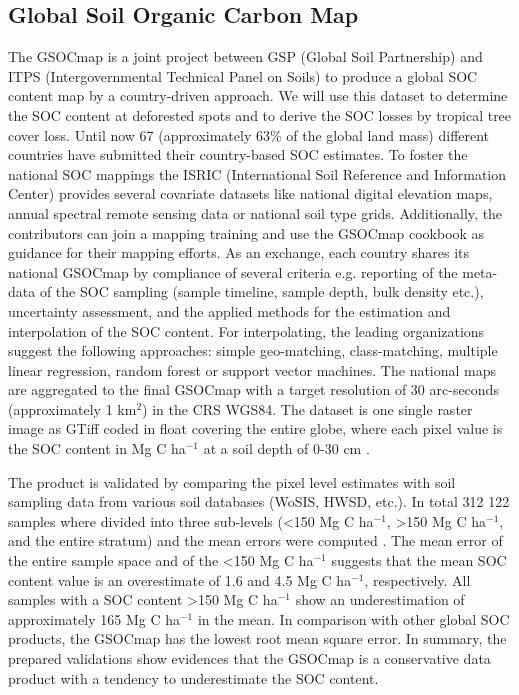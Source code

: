 	\subsection{Global Soil Organic Carbon Map}
		The \ac{GSOCmap} is a joint project between GSP (Global Soil Partnership) and ITPS (Intergovernmental Technical Panel on Soils) to produce a global \ac{SOC} content map by a country-driven approach. We will use this dataset to determine the \ac{SOC} content at deforested spots and to derive the \ac{SOC} losses by tropical tree cover loss. Until now 67 (approximately 63\% of the global land mass) different countries have submitted their country-based \ac{SOC} estimates. To foster the national \ac{SOC} mappings the ISRIC (International Soil Reference and Information Center) provides several covariate datasets like national digital elevation maps, annual spectral remote sensing data or national soil type grids. Additionally, the contributors can join a mapping training and use the \ac{GSOCmap} cookbook as guidance for their mapping efforts. As an exchange, each country shares its national \ac{GSOCmap} by compliance of several criteria e.g. reporting of the meta-data of the \ac{SOC} sampling (sample timeline, sample depth, bulk density etc.), uncertainty assessment, and the applied methods for the estimation and interpolation of the \ac{SOC} content. For interpolating, the leading organizations suggest the following approaches: simple geo-matching, class-matching, multiple linear regression, random forest or support vector machines. The national maps are aggregated to the final \ac{GSOCmap} with a target resolution of 30 arc-seconds (approximately 1 km$^2$) in the \ac{CRS} \ac{WGS84}. The dataset is one single raster image as \ac{GTiff} coded in float covering the entire globe, where each pixel value is the \ac{SOC} content in Mg C ha$^{-1}$ at a soil depth of 0-30 cm \citep{FAO2018}.

		The product is validated by comparing the pixel level estimates with soil sampling data from various soil databases (WoSIS, HWSD, etc.). In total 312 122 samples where divided into three sub-levels (<150 Mg C ha$^{-1}$, >150 Mg C ha$^{-1}$, and the entire stratum) and the mean errors were computed . The mean error of the entire sample space and of the <150 Mg C ha$^{-1}$ suggests that the mean \ac{SOC} content value is an overestimate of 1.6 and 4.5 Mg C ha$^{-1}$, respectively. All samples with a \ac{SOC} content >150 Mg C ha$^{-1}$ show an underestimation of approximately 165 Mg C ha$^{-1}$ in the mean. In comparison with other global \ac{SOC} products, the \ac{GSOCmap} has the lowest root mean square error. In summary, the prepared validations show evidences that the \ac{GSOCmap} is a conservative data product with a tendency to underestimate the \ac{SOC} content.


